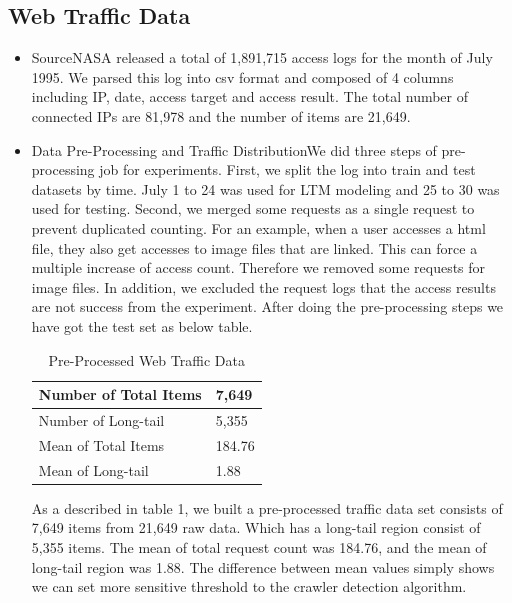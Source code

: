 \documentclass[sigconf,anonymous=true]{acmart}
\begin{document}
\subsection{Web Traffic Data}
\begin{itemize}
\item Source\newline NASA released a total of 1,891,715 access logs for the month of July 1995. We parsed this log into csv format and composed of 4 columns including IP, date, access target and access result.
The total number of connected IPs are 81,978 and the number of items are 21,649.\newline

\item Data Pre-Processing and Traffic Distribution\newline We did three steps of pre-processing job for experiments. First, we split the log into train and test datasets by time. July 1 to 24 was used for LTM modeling and 25 to 30 was used for testing.
Second, we merged some requests as a single request to prevent duplicated counting. For an example, when a user accesses a html file, they also get accesses to image files that are linked. This can force a multiple increase of access count. Therefore we removed some requests for image files. In addition, we excluded the request logs that the access results are not success from the experiment. After doing the pre-processing steps we have got the test set as below table.

\begin{table}[H]
  \caption{Pre-Processed Web Traffic Data}
  \label{tab:freq}
    \begin{tabular}{| p{3.1cm} | p{2cm} |}
    \hline
    Number of Total Items & 7,649 \\ \hline
    Number of Long-tail & 5,355 \\ \hline
    Mean of Total Items & 184.76 \\ \hline
    Mean of Long-tail & 1.88 \\ \hline
    \end{tabular}
\end{table}

As a described in table 1, we built a pre-processed traffic data set consists of 7,649 items from 21,649 raw data. Which has a long-tail region consist of 5,355 items. The mean of total request count was 184.76, and the mean of long-tail region was 1.88. The difference between mean values simply shows we can set more sensitive threshold to the crawler detection algorithm.


\end{itemize}
\end{document}
